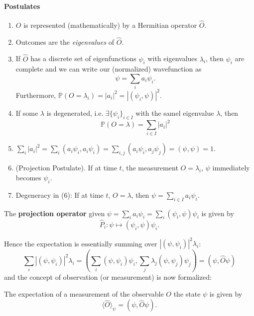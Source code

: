\documentclass[a4paper]{article}
\begin{document}
\paragraph{Postulates} 
\begin{enumerate}[(1)]
    \item $O$ is represented (mathematically) by a Hermitian operator $\hat{O}$. 
    \item Outcomes are the \textit{eigenvalues} of $\hat{O}$. 
    \item If $\hat{O}$ has a discrete set of eigenfunctions $ \psi_i $ with eigenvalues $ \lambda_i $, then $ \psi_i $ are complete and we can write our (normalized) wavefunction as 
    \[
        \psi = \sum_{i} a_i \psi_i. 
    \]
    Furthermore, $ \mathbb{P}(O = \lambda_i) = |a_i|^2 = |(\psi_i,\psi)|^2 $. 
    \item If some $\lambda$ is degenerated, i.e. $ \exists \{\psi_i\}_{i\in I} $ with the samel eigenvalue $\lambda$, then
    \[
        \mathbb{P}(O=\lambda) = \sum_{i\in I} |a_i|^2
    \]
    \item $\displaystyle \sum_i\left|a_i\right|^2=\sum_i\left(a_i \psi_i, a_i \psi_i\right)=\sum_{i, j}\left(a_i \psi_i, a_j \psi_j\right)=(\psi, \psi)=1$. 
    \item (Projection Postulate). If at time $t$, the measurement $ O=\lambda_i $, $ \psi $ immediately becomes $\psi_i$.  
    \item Degeneracy in (6): If at time $t$, $ O = \lambda $, then $ \psi = \sum_{i\in I} a_i \psi_i $. 
\end{enumerate}

\begin{definition}
    The \textbf{projection operator} given $ \psi = \sum_i a_i \psi_i = \sum_i (\psi_i,\psi)\psi_i $ is given by 
    \[
        \hat{P}_i: \psi \mapsto (\psi_i,\psi)\psi_i. 
    \]
\end{definition}

Hence the expectation is essentially summing over $ |(\psi,\psi_i)|^2 \lambda_i $: 
\[
    \sum_i\left|\left(\psi, \psi_i\right)\right|^2 \lambda_i 
        =\left(\sum_i\left(\psi, \psi_i\right) \psi_i, \sum_j \lambda_j\left(\psi, \psi_j\right) \psi_j\right)=(\psi, \hat{O} \psi)
\]
and the concept of observation (or measurement) is now formalized: 
\begin{proposition}
    The expectation of a measurement of the observable $O$ the state $\psi$ is given by 
    \[
        \langle \hat{O} \rangle_{\psi} = (\psi, \hat{O}\psi).
    \]
\end{proposition}
\end{document}
